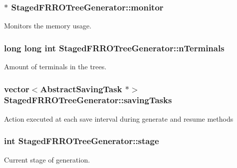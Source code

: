 \subsubsection[{\texorpdfstring{monitor}{monitor}}]{$\ast$ Staged\+F\+R\+R\+O\+Tree\+Generator\+::monitor\hspace{0.3cm}{\ttfamily [private]}}\hypertarget{class_staged_f_r_r_o_tree_generator_a7f6c92a9f21e8e654dec6a592dbea5d4}{}\label{class_staged_f_r_r_o_tree_generator_a7f6c92a9f21e8e654dec6a592dbea5d4}
Monitors the memory usage. 
\subsubsection[{\texorpdfstring{n\+Terminals}{nTerminals}}]{\setlength{\rightskip}{0pt plus 5cm}long long int Staged\+F\+R\+R\+O\+Tree\+Generator\+::n\+Terminals\hspace{0.3cm}{\ttfamily [private]}}\hypertarget{class_staged_f_r_r_o_tree_generator_a4b9c21f516630824f8057aae16f38918}{}\label{class_staged_f_r_r_o_tree_generator_a4b9c21f516630824f8057aae16f38918}
Amount of terminals in the trees. 
\subsubsection[{\texorpdfstring{saving\+Tasks}{savingTasks}}]{\setlength{\rightskip}{0pt plus 5cm}vector$<${\bf Abstract\+Saving\+Task} $\ast$$>$ Staged\+F\+R\+R\+O\+Tree\+Generator\+::saving\+Tasks\hspace{0.3cm}{\ttfamily [private]}}\hypertarget{class_staged_f_r_r_o_tree_generator_a8e44b058bac0e695c3956dee14ca36c2}{}\label{class_staged_f_r_r_o_tree_generator_a8e44b058bac0e695c3956dee14ca36c2}
Action executed at each save interval during generate and resume methods 
\subsubsection[{\texorpdfstring{stage}{stage}}]{\setlength{\rightskip}{0pt plus 5cm}int Staged\+F\+R\+R\+O\+Tree\+Generator\+::stage\hspace{0.3cm}{\ttfamily [private]}}\hypertarget{class_staged_f_r_r_o_tree_generator_a9410e8bb105a69fc8636e718e7ac9dfc}{}\label{class_staged_f_r_r_o_tree_generator_a9410e8bb105a69fc8636e718e7ac9dfc}
Current stage of generation. 
